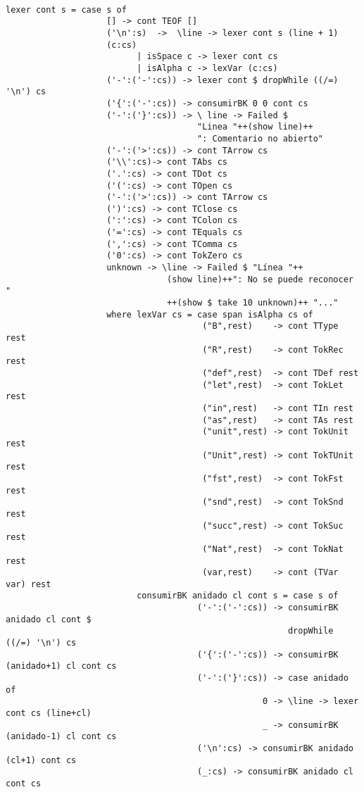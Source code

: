 \documentclass[a4paper]{report}
\begin{document}
\begin{lstlisting}

lexer cont s = case s of
                    [] -> cont TEOF []
                    ('\n':s)  ->  \line -> lexer cont s (line + 1)
                    (c:cs)
                          | isSpace c -> lexer cont cs
                          | isAlpha c -> lexVar (c:cs)
                    ('-':('-':cs)) -> lexer cont $ dropWhile ((/=) '\n') cs
                    ('{':('-':cs)) -> consumirBK 0 0 cont cs  
                    ('-':('}':cs)) -> \ line -> Failed $
                                      "Linea "++(show line)++
                                      ": Comentario no abierto"
                    ('-':('>':cs)) -> cont TArrow cs
                    ('\\':cs)-> cont TAbs cs
                    ('.':cs) -> cont TDot cs
                    ('(':cs) -> cont TOpen cs
                    ('-':('>':cs)) -> cont TArrow cs
                    (')':cs) -> cont TClose cs
                    (':':cs) -> cont TColon cs
                    ('=':cs) -> cont TEquals cs
                    (',':cs) -> cont TComma cs
                    ('0':cs) -> cont TokZero cs
                    unknown -> \line -> Failed $ "Línea "++
                                (show line)++": No se puede reconocer "
                                ++(show $ take 10 unknown)++ "..."
                    where lexVar cs = case span isAlpha cs of
                                       ("B",rest)    -> cont TType rest
                                       ("R",rest)    -> cont TokRec rest
                                       ("def",rest)  -> cont TDef rest
                                       ("let",rest)  -> cont TokLet rest
                                       ("in",rest)   -> cont TIn rest
                                       ("as",rest)   -> cont TAs rest
                                       ("unit",rest) -> cont TokUnit rest
                                       ("Unit",rest) -> cont TokTUnit rest
                                       ("fst",rest)  -> cont TokFst rest
                                       ("snd",rest)  -> cont TokSnd rest
                                       ("succ",rest) -> cont TokSuc rest
                                       ("Nat",rest)  -> cont TokNat rest
                                       (var,rest)    -> cont (TVar var) rest
                          consumirBK anidado cl cont s = case s of
                                      ('-':('-':cs)) -> consumirBK anidado cl cont $
                                                        dropWhile ((/=) '\n') cs
                                      ('{':('-':cs)) -> consumirBK (anidado+1) cl cont cs 
                                      ('-':('}':cs)) -> case anidado of
                                                   0 -> \line -> lexer cont cs (line+cl)
                                                   _ -> consumirBK (anidado-1) cl cont cs
                                      ('\n':cs) -> consumirBK anidado (cl+1) cont cs
                                      (_:cs) -> consumirBK anidado cl cont cs     
                                           

\end{lstlisting}
\end{document}
